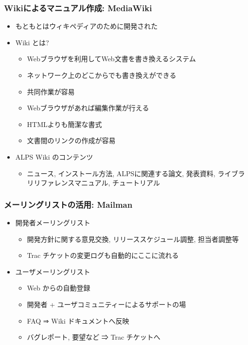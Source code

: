 \begin{frame}
  \frametitle{Wikiによるマニュアル作成: MediaWiki}
  \begin{itemize}
  \item もともとはウィキペディアのために開発された
  \item Wiki とは?
    \begin{itemize}
    \item Webブラウザを利用してWeb文書を書き換えるシステム
    \item ネットワーク上のどこからでも書き換えができる
    \item 共同作業が容易
    \item Webブラウザがあれば編集作業が行える
    \item HTMLよりも簡潔な書式
    \item 文書間のリンクの作成が容易
    \end{itemize}
  \item ALPS Wiki のコンテンツ
    \begin{itemize}
    \item ニュース, インストール方法, ALPSに関連する論文, 発表資料, ライブラリリファレンスマニュアル, チュートリアル
    \end{itemize}
  \end{itemize}
\end{frame}

\begin{frame}
  \frametitle{メーリングリストの活用: Mailman}
  \begin{itemize}
    \setlength{\itemsep}{1em}
  \item 開発者メーリングリスト
    \begin{itemize}
    \item 開発方針に関する意見交換, リリーススケジュール調整, 担当者調整等
    \item Trac チケットの変更ログも自動的にここに流れる
    \end{itemize}
  \item ユーザメーリングリスト
    \begin{itemize}
    \item Web からの自動登録
    \item 開発者 + ユーザコミュニティーによるサポートの場
    \item FAQ ⇒ Wiki ドキュメントへ反映
    \item バグレポート, 要望など ⇒ Trac チケットへ
    \end{itemize}
  \end{itemize}
\end{frame}

